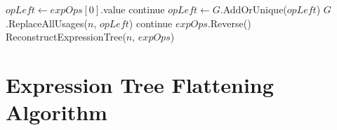 \documentclass[12pt,openany,a4paper]{book}
\begin{document}
\begin{algorithm}[H]
    \begin{algorithmic}[1]
                    \State $opLeft \gets expOps[0]$.value
                        \State continue
                    \EndIf
                    \State $opLeft \gets G$.AddOrUnique($opLeft$)
                    \State $G$.ReplaceAllUsages($n$, $opLeft$)
                    \State continue
                \EndIf
                \State $expOps$.Reverse()
                \State ReconstructExpressionTree($n$, $expOps$)
            \EndFor
        \EndProcedure
    \end{algorithmic}
\end{algorithm}

\section{Expression Tree Flattening Algorithm}
\label{flattentree}
\end{document}
